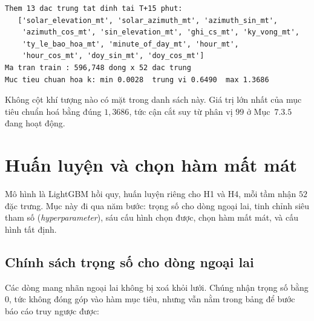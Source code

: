 \begingroup
\par{}\vspace{8pt}
\small\renewcommand{\baselinestretch}{1.0}\selectfont
\begin{verbatim}
Them 13 dac trung tat dinh tai T+15 phut:
   ['solar_elevation_mt', 'solar_azimuth_mt', 'azimuth_sin_mt',
    'azimuth_cos_mt', 'sin_elevation_mt', 'ghi_cs_mt', 'ky_vong_mt',
    'ty_le_bao_hoa_mt', 'minute_of_day_mt', 'hour_mt',
    'hour_cos_mt', 'doy_sin_mt', 'doy_cos_mt']
Ma tran train : 596,748 dong x 52 dac trung
Muc tieu chuan hoa k: min 0.0028  trung vi 0.6490  max 1.3686
\end{verbatim}
\par\vspace{8pt}
\endgroup
Không cột khí tượng nào có mặt trong danh sách này. Giá trị lớn nhất của mục tiêu chuẩn hoá
bằng đúng $1{,}3686$, tức cận cắt suy từ phân vị $99$ ở Mục~$7.3.5$ đang hoạt động.

\FloatBarrier
\section{Huấn luyện và chọn hàm mất mát}

Mô hình là LightGBM hồi quy, huấn luyện riêng cho H1 và H4, mỗi tầm nhận $52$ đặc trưng.
Mục này đi qua năm bước: trọng số cho dòng ngoại lai, tinh chỉnh siêu tham số
(\textit{hyperparameter}), sáu cấu hình chọn được, chọn hàm mất mát, và cấu hình tất định.

\FloatBarrier
\subsection{Chính sách trọng số cho dòng ngoại lai}

Các dòng mang nhãn ngoại lai không bị xoá khỏi lưới. Chúng nhận trọng số bằng $0$, tức không
đóng góp vào hàm mục tiêu, nhưng vẫn nằm trong bảng để bước báo cáo truy ngược được:

